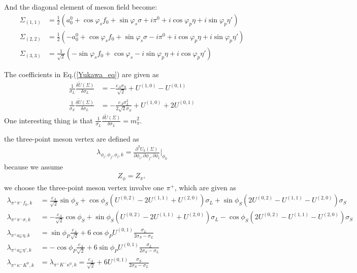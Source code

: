 \documentclass[12pt]{article}
\begin{document}
And the diagonal element of meson field become:
\begin{align}
\Sigma_{(1,1)}&=\frac{1}{2}(a_0^0+\cos\varphi_s f_0+\sin\varphi_s \sigma+i\pi^0 + i \cos\varphi_p \eta+i\sin\varphi_p \eta')\\
\Sigma_{(2,2)}&=\frac{1}{2}(- a_0^0+\cos\varphi_s f_0+\sin\varphi_s \sigma - i\pi^0  + i\cos\varphi_p \eta+i\sin\varphi_p \eta')\\
\Sigma_{(3,3)}&= \frac{1}{\sqrt{2} }(-\sin\varphi_s f_0 +\cos\varphi_s -i \sin\varphi_p\eta +i \cos\varphi_p \eta')
\end{align}

The coefficients in Eq.(\ref{Yukawa_eq}) are given as
\begin{align}
\frac{1}{\sigma_L} \frac{\delta \tilde U(\Sigma)}{\delta \sigma_L}&=- \frac{c_A \sigma_S}{\sqrt{2}} +U^{(1,0)} -U^{(0,1)}\\
\frac{1}{\sigma_S} \frac{\delta \tilde U(\Sigma)}{\delta \sigma_L}&=- \frac{c_A \sigma_L^2}{2 \sqrt{2} \sigma_S}+U^{(1,0)} +2 U^{(0,1)} 
\end{align}
One interesting thing is that  $\frac{1}{\sigma_L} \frac{\delta \tilde U(\Sigma)}{\delta \sigma_L}=m_\pi^2$.

the three-point meson vertex are defined as
\begin{align}
\lambda_{\phi_i,\phi_j,\phi_l,k}=\frac{\partial^3 U_k(\Sigma)}{\partial \phi_i,\partial \phi_j,\partial \phi_l}\bigg |_{\phi_0}
\end{align}
because we assume
\begin{align}
Z_\phi=Z_{\pi^+}
\end{align}
we choose the three-point meson vertex involve one $\pi^+$, which are given as
\begin{align}
\lambda_{\pi^+\pi^-f_0,k}&=\frac{c_A}{\sqrt{2}} \sin\phi_S+\cos\phi_S(U^{(0,2)} - 2 U^{(1,1)} + U^{(2,0)}) \sigma_L+\sin\phi_S(2 U^{(0,2)} - U^{(1,1)} - U^{(2,0)})  \sigma_S\\
\lambda_{\pi^+\pi^-\sigma,k}&=-\frac{c_A}{\sqrt{2}} \cos\phi_S+\sin\phi_S(U^{(0,2)} - 2 U^{(1,1)} + U^{(2,0)}) \sigma_L-\cos\phi_S(2 U^{(0,2)} - U^{(1,1)} - U^{(2,0)})  \sigma_S\\
\lambda_{\pi^+a_0^-\eta,k}&=\sin\phi_P \frac{c_A} {\sqrt{2}} + 6 \cos\phi_PU^{(0,1)} \frac{ \sigma_L}{2 \sigma_S-\sigma_L}\\
\lambda_{\pi^+a_0^-\eta',k}&=-\cos\phi_P\frac{c_A}{\sqrt{2}} +6 \sin\phi_P U^{(0,1)} \frac{\sigma_L}{2 \sigma_S-\sigma_L}\\
\lambda_{\pi^+\kappa^-K^0,k}&=\lambda_{\pi^+K^-\kappa^0,k}=\frac{c_A}{\sqrt{2}} +6 U^{(0,1)} \frac{\sigma_S}{2 \sigma_S-\sigma_L}
\end{align}
\end{document}
